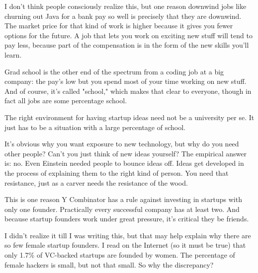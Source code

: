 I don't think people
                    consciously realize this, but one reason downwind jobs like
                    churning out Java for a bank pay so well is precisely that
                    they are downwind. The market price for that kind of work is
                    higher because it gives you fewer options for the future. A
                    job that lets you work on exciting new stuff will tend to
                    pay less, because part of the compensation is in the form of
                    the new skills you'll learn.

Grad school is the
                    other end of the spectrum from a coding job at a big
                    company: the pay's low but you spend most of your time
                    working on new stuff. And of course, it's called "school,"
                    which makes that clear to everyone, though in fact all jobs
                    are some percentage school.

The right environment
                    for having startup ideas need not be a university per se. It
                    just has to be a situation with a large percentage of
                    school.

It's obvious why you want exposure to new
                    technology, but why do you need other people? Can't you just
                    think of new ideas yourself? The empirical answer is: no.
                    Even Einstein needed people to bounce ideas off. Ideas get
                    developed in the process of explaining them to the right
                    kind of person. You need that resistance, just as a carver
                    needs the resistance of the wood.

This is one
                    reason Y Combinator has a rule against investing in startups
                    with only one founder. Practically every successful company
                    has at least two. And because startup founders work under
                    great pressure, it's critical they be friends.

I
                    didn't realize it till I was writing this, but that may help
                    explain why there are so few female startup founders. I read
                    on the Internet (so it must be true) that only 1.7\% of
                    VC-backed startups are founded by women. The percentage of
                    female hackers is small, but not that small. So why the
                    discrepancy?

